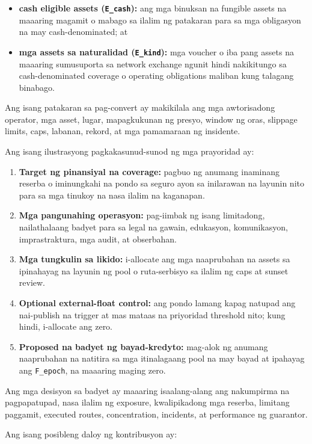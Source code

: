 \documentclass[11pt]{article}
\begin{document}
\begin{itemize}[leftmargin=*]
\item \textbf{cash eligible assets (\texttt{E\_cash}):} ang mga binuksan na fungible assets na maaaring magamit o mabago sa ilalim ng patakaran para sa mga obligasyon na may cash-denominated; at
\item \textbf{mga assets sa naturalidad (\texttt{E\_kind}):} mga voucher o iba pang assets na maaaring sumusuporta sa network exchange ngunit hindi nakikitungo sa cash-denominated coverage o operating obligations maliban kung talagang binabago.
\end{itemize}
Ang isang patakaran sa pag-convert ay makikilala ang mga awtorisadong operator, mga asset, lugar, mapagkukunan ng presyo, window ng oras, slippage limits, caps, labanan, rekord, at mga pamamaraan ng insidente.

Ang isang ilustrasyong pagkakasunud-sunod ng mga prayoridad ay:

\begin{enumerate}[leftmargin=*]
\item \textbf{Target ng pinansiyal na coverage:} pagbuo ng anumang inaminang reserba o iminungkahi na pondo sa seguro ayon sa inilarawan na layunin nito para sa mga tinukoy na nasa ilalim na kaganapan.
\item \textbf{Mga pangunahing operasyon:} pag-iimbak ng isang limitadong, nailathalaang badyet para sa legal na gawain, edukasyon, komunikasyon, imprastraktura, mga audit, at obserbahan.
\item \textbf{Mga tungkulin sa likido:} i-allocate ang mga naaprubahan na assets sa ipinahayag na layunin ng pool o ruta-serbisyo sa ilalim ng caps at sunset review.
\item \textbf{Optional external-float control:} ang pondo lamang kapag natupad ang nai-publish na trigger at mas mataas na priyoridad threshold nito; kung hindi, i-allocate ang zero.
\item \textbf{Proposed na badyet ng bayad-kredyto:} mag-alok ng anumang naaprubahan na natitira sa mga itinalagaang pool na may bayad at ipahayag ang \texttt{F\_epoch}, na maaaring maging zero.
\end{enumerate}
Ang mga desisyon sa badyet ay maaaring isaalang-alang ang nakumpirma na pagpapatupad, nasa ilalim ng exposure, kwalipikadong mga reserba, limitang paggamit, executed routes, concentration, incidents, at performance ng guarantor.

Ang isang posibleng daloy ng kontribusyon ay:
\end{document}
